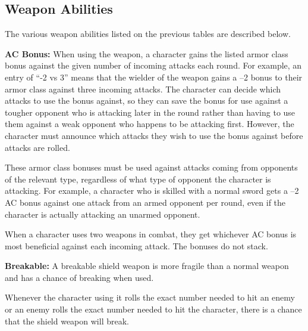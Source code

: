 \begin{multicols*}{2}
\section{Weapon Abilities}\label{sec:Weapon Abilities}
The various weapon abilities listed on the previous tables are described below.

\textbf{AC Bonus:} When using the weapon, a character gains the listed armor class bonus against the given number of incoming attacks each round. For example, an entry of “-2 vs 3” means that the wielder of the weapon gains a –2 bonus to their armor class against three incoming attacks. The character can decide which attacks to use the bonus against, so they can save the bonus for use against a tougher opponent who is attacking later in the round rather than having to use them against a weak opponent who happens to be attacking first. However, the character must announce which attacks they wish to use the bonus against before attacks are rolled.

These armor class bonuses must be used against attacks coming from opponents of the relevant type, regardless of what type of opponent the character is attacking. For example, a character who is skilled with a normal sword gets a –2 AC bonus against one attack from an armed opponent per round, even if the character is actually attacking an unarmed opponent.

When a character uses two weapons in combat, they get whichever AC bonus is most beneficial against each incoming attack. The bonuses do not stack.


\textbf{Breakable:} A breakable shield weapon is more fragile than a normal weapon and has a chance of breaking when used.

Whenever the character using it rolls the exact number needed to hit an enemy or an enemy rolls the exact number needed to hit the character, there is a chance that the shield weapon will break.


\end{multicols*}

